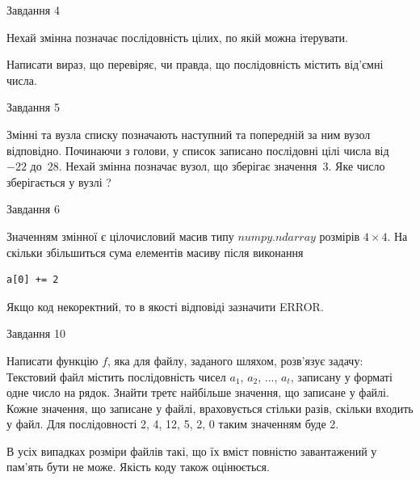 \documentclass[12pt, ukrainian]{article}
\begin{document}
{               
{\begin{center}Завдання {4}\end{center}}
\vspace{-6mm}
Нехай змінна  позначає послідовність цілих, по якій можна ітерувати.

Написати вираз, що перевіряє, чи правда, що послідовність  містить від’ємні числа.\par

\vspace{10mm}
               
{\begin{center}Завдання {5}\end{center}}
\vspace{-6mm}
Змінні  та  вузла списку позначають наступний та попередній за ним вузол відповідно. Починаючи з голови, у список записано послідовні цілі числа від~$-22$ до~$28$. Нехай змінна  позначає вузол, що зберігає значення~$3$.
Яке число зберігається у вузлі  ?\par

               
{\begin{center}Завдання {6}\end{center}}
\vspace{-6mm}
Значенням змінної  є цілочисловий масив типу $numpy.ndarray$ розмірів $4{\times}4$. На скільки збільшиться сума елементів масиву  після виконання
\begin{verbatim}
a[0] += 2
\end{verbatim}


Якщо код некоректний, то в якості відповіді зазначити ERROR.\par

               
{\begin{center}Завдання {10}\end{center}}
\vspace{-6mm}

Написати функцію $f$, яка для файлу, заданого шляхом, розв’язує задачу:\\ Текстовий файл містить послідовність чисел $a_1$, $a_2$, $\ldots$, $a_t$, записану у форматі одне число на рядок. Знайти третє найбільше значення, що записане у файлі. Кожне значення, що записане у файлі, враховується стільки разів, скільки входить у файл. Для послідовності 2, 4, 12, 5, 2, 0 таким значенням буде 2.

В усіх випадках розміри файлів такі, що їх вміст повністю завантажений у пам'ять бути не може. Якість коду також оцінюється.



}
\end{document}
